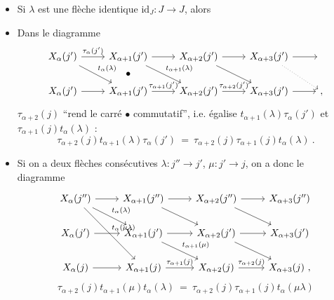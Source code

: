 \documentclass[11pt]{article}
\begin{document}
\begin{itemize}[leftmargin=3em]
\item[(i)] Si $\lambda$ est une flèche identique $\mathrm{id}_J : J\longrightarrow J$, alors  %
\item[(ii)] Dans le diagramme
\[
\begin{tikzcd}
X_\alpha(j') \arrow[r,"\tau_\alpha(j')"] \arrow[dr,"t_\alpha(\lambda)"] & X_{\alpha+1}(j') \arrow[r] \arrow[dr,"t_{\alpha+1}(\lambda)"] \arrow[d,phantom,"\bullet"] & X_{\alpha+2}(j') \arrow[r] \arrow[dr] & X_{\alpha+3}(j') \arrow[r] \arrow[dr,dotted] & {} \\
X_\alpha(j') \arrow[r] & X_{\alpha+1}(j') \arrow[r,"\tau_{\alpha+1}(j')"] & X_{\alpha+2}(j') \arrow[r,"\tau_{\alpha+2}(j')"] & X_{\alpha+3}(j') \arrow[r] & {,}
\end{tikzcd}
\] %
$\tau_{\alpha+2}(j)$ “rend le carré $\bullet$ commutatif”, i.e. égalise $t_{\alpha+1}(\lambda)\tau_\alpha(j')$ et $\tau_{\alpha+1}(j)t_\alpha(\lambda)$ :
\[
\boxed{\tau_{\alpha+2}(j)t_{\alpha+1}(\lambda)\tau_\alpha(j')\ =\ \tau_{\alpha+2}(j)\tau_{\alpha+1}(j)t_\alpha(\lambda)\ .}
\]
\item[(iii)] Si on a deux flèches consécutives $\lambda : j''\longrightarrow j'$, $\mu : j'\longrightarrow j$, on a donc le diagramme
\[
\begin{tikzcd}
X_\alpha(j'') \arrow[r] \arrow[dr,"t_\alpha(\lambda)"] \arrow[ddr,"t_\alpha(\mu\lambda)"] & X_{\alpha+1}(j'') \arrow[r] \arrow[dr] & X_{\alpha+2}(j'') \arrow[r] \arrow[dr] & X_{\alpha+3}(j'') \\
X_\alpha(j') \arrow[r] & X_{\alpha+1}(j') \arrow[r] \arrow[dr,"t_{\alpha+1}(\mu)"] & X_{\alpha+2}(j') \arrow[r] \arrow[dr] & X_{\alpha+3}(j') \\
X_\alpha(j) \arrow[r] & X_{\alpha+1}(j) \arrow[r,"\tau_{\alpha+1}(j)"] & X_{\alpha+2}(j) \arrow[r,"\tau_{\alpha+2}(j)"] & X_{\alpha+3}(j)\ ,
\end{tikzcd}
\]
\[
\boxed{\tau_{\alpha+2}(j)t_{\alpha+1}(\mu)t_\alpha(\lambda)\ =\ \tau_{\alpha+2}(j)\tau_{\alpha+1}(j)t_\alpha(\mu\lambda)}
\]
\end{itemize}
\end{document}
